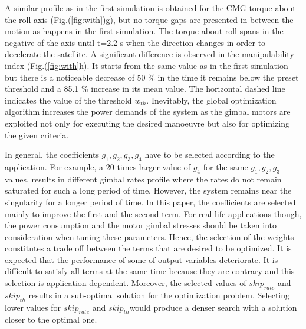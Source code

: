 \documentclass[journal]{new-aiaa}
\begin{document}
A similar profile as in the first simulation is obtained for the CMG torque about the roll axis  (Fig.(\ref{fig:with})g), but no torque gaps are presented in between the motion as happens in the first simulation. The torque about roll spans in the negative of the axis until t=2.2 s when the direction changes in order to decelerate the satellite. A significant difference is observed in the manipulability index (Fig.(\ref{fig:with}h). It starts from the same value as in the first simulation but there is a noticeable decrease of 50 \% in the time it remains below the preset threshold and a 85.1 \% increase in its mean value. The horizontal dashed line indicates the value of the threshold $w_{th}$. 
Inevitably, the global optimization algorithm increases the power demands of the system as the gimbal motors are exploited not only for executing the desired manoeuvre but also for optimizing the given criteria. 

In general, the coefficients $g_1, g_2, g_3, g_4$  have to be selected according to the application. For example, a 20 times larger value of $g_4$ for the same $g_1, g_2, g_3$ values, results in different gimbal rates profile where the rates do not remain saturated for such a long period of time. However, the system remains near the singularity for a longer period of time. In this paper, the coefficients are selected mainly to improve the first and the second term. For real-life applications though, the power consumption and the motor gimbal stresses should be taken into consideration when tuning these parameters.
Hence, the selection of the weights constitutes a trade off between the terms that are desired to be optimized. It is expected that the performance of some of output variables deteriorate. It is difficult to satisfy all terms at the same time because they are contrary and this selection is application dependent. Moreover, the selected values of ${skip}_{rate}$ and ${skip}_{th}$ results in a sub-optimal solution for the optimization problem. Selecting lower values for ${skip}_{rate}$ and ${skip}_{th}$would produce a denser search with a solution closer to the optimal one.
\end{document}
